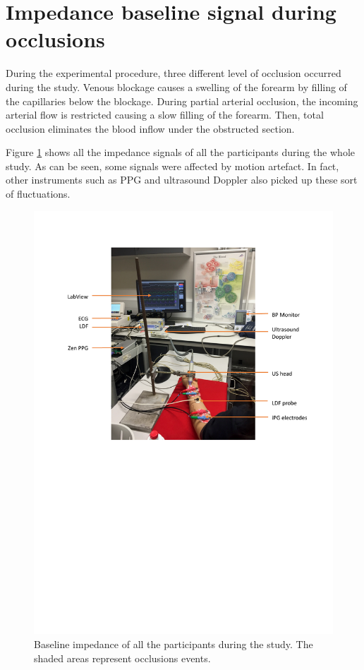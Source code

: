 \section{Impedance baseline signal during occlusions}
\label{section5.1}
During the experimental procedure, three different level of occlusion occurred during the study. Venous blockage causes a swelling of the forearm by filling of the capillaries below the blockage. During partial arterial occlusion, the incoming arterial flow is restricted causing a slow filling of the forearm. Then, total occlusion eliminates the blood inflow under the obstructed section. 


Figure \ref{fig:rb:all_participants} shows all the impedance signals of all the participants during the whole study. As can be seen, some signals were affected by motion artefact. In fact, other instruments such as PPG and ultrasound Doppler also picked up these sort of fluctuations. 

\begin{figure}
	\includegraphics[width=\textwidth,height=\textheight,keepaspectratio]{figure1}    
	\caption{Baseline impedance of all the participants during the study. The shaded areas represent occlusions events.}
	\label{fig:rb:all_participants}
\end{figure}

